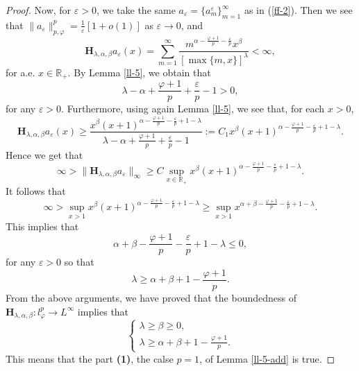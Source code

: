 \documentclass[10pt,a4paper]{amsart}
\begin{document}
\begin{proof}
Now, for $\varepsilon>0$, we take the same $a_{\varepsilon}=\{a_m^{\varepsilon}\}_{m=1}^{\infty}$ as in (\ref{ff-2}). Then we see that
$\|a_{\varepsilon}\|_{p, \varphi}^p=\frac{1}{\varepsilon}[1+o(1)]$ as $\varepsilon \rightarrow 0$, and 
 \begin{equation}
\mathbf{H}_{\lambda, \alpha, \beta}a_{\varepsilon}(x)=\sum_{m=1}^{\infty}\frac{m^{\alpha-\frac{\varphi+1}{p}-\frac{\varepsilon}{p}}x^{\beta}}{[\max\{m,x\}]^{\lambda}}<\infty,\nonumber 
\end{equation}  
for a.e. $x\in \mathbb{R}_{+}$. By Lemma \ref{ll-5}, we obtain that
$$\lambda-\alpha+\frac{\varphi+1}{p}+\frac{\varepsilon}{p}-1>0,$$
for any $\varepsilon>0$. %
Furthermore, using again Lemma \ref{ll-5}, we see that, for each $x>0$, 
 \begin{equation}
\mathbf{H}_{\lambda, \alpha, \beta}a_{\varepsilon}(x)\geq \frac{x^{\beta}(x+1)^{\alpha-\frac{\varphi+1}{p}-\frac{\varepsilon}{p}+1-\lambda}}{\lambda-\alpha+\frac{\varphi+1}{p}+\frac{\varepsilon}{p}-1}:=C_1x^{\beta}(x+1)^{\alpha-\frac{\varphi+1}{p}-\frac{\varepsilon}{p}+1-\lambda}.\nonumber 
\end{equation} 
Hence we get that
$$\infty>\|\mathbf{H}_{\lambda, \alpha, \beta}a_{\varepsilon}\|_{\infty} \geq C \sup_{x\in \mathbb{R}_{+}}x^{\beta}(x+1)^{\alpha-\frac{\varphi+1}{p}-\frac{\varepsilon}{p}+1-\lambda}.$$
It follows that 
$$\infty>\sup_{x>1} x^{\beta}(x+1)^{\alpha-\frac{\varphi+1}{p}-\frac{\varepsilon}{p}+1-\lambda}\geq \sup_{x>1}x^{\alpha+\beta-\frac{\varphi+1}{p}-\frac{\varepsilon}{p}+1-\lambda}.$$
This implies that
$$\alpha+\beta-\frac{\varphi+1}{p}-\frac{\varepsilon}{p}+1-\lambda \leq 0,$$
for any $\varepsilon>0$ so that
\begin{equation}\label{ad-eq-3}\lambda\geq \alpha+\beta+1-\frac{\varphi+1}{p}.\end{equation}
From the above arguments, we have proved that the boundedness of $\mathbf{H}_{\lambda, \alpha, \beta}: l_{\varphi}^p \rightarrow L^{\infty}$ implies that  
\begin{equation} 
\begin{cases}
\lambda\geq \beta\geq 0, \\
\lambda\geq \alpha+\beta+1-\frac{\varphi+1}{p}. \nonumber 
\end{cases}
\end{equation}
This means that the part {\bf (1)}, the calse $p=1$, of Lemma \ref{ll-5-add} is true. 


\end{proof}
\end{document}
